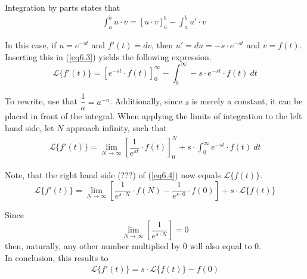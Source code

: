 \begin{tcolorbox}[colback=gray!5!white,colframe=gray!!black,title=Proof 6.1]
Integration by parts states that 
\begin{align}
\int_{a}^{b}{u\cdot v}=\left[u\cdot v\right]_{a}^{b}-\int_{a}^{b}u'\cdot v\
\label{eq6.3}
\end{align}

In this case, if $u=e^{-st}$ and $f'(t)=dv$, then $u'=du=-s\cdot e^{-st}$ and $v=f(t)$.
Inserting this in (\ref{eq6.3}) yields the following expression.
$$\mathcal{L}\{f'(t)\}=\left[e^{-st}\cdot f(t)\right]_{0}^{\infty}-\int_{0}^{\infty} -s\cdot e^{-st}\cdot f(t)\ dt$$

To rewrite, use that $\dfrac{1}{a}=a^{-n}$. Additionally, since $s$ is merely a constant, it can be placed in front of the integral. When applying the limits of integration to the left hand side, let $N$ approach infinity, such that
\begin{align}
\mathcal{L}\{f'(t)\}=\lim_{N \to \infty}\left[\dfrac{1}{e^{st}}\cdot f(t)\right]_{0}^{N}+s\cdot \int_{0}^{\infty}e^{-st}\cdot f(t)\ dt
\label{eq6.4}
\end{align}

Note, that the right hand side (???) of (\ref{eq6.4}) now equals $\mathcal{L}\{f(t)\}$. 
$$\mathcal{L}\{f'(t)\} = \lim_{N \to \infty}\left[\dfrac{1}{e^{s\cdot N}}\cdot f(N)-\dfrac{1}{e^{s\cdot 0}}\cdot f(0)\right]+s\cdot \mathcal{L}\{f(t)\}$$

Since $$\lim_{N \to \infty}\left[\dfrac{1}{e^{s\cdot N}}\right]=0$$ then, naturally, any other number multiplied by 0 will also equal to 0.\\
In conclusion, this results to
\begin{align*}
\mathcal{L}\{f'(t)\} = s\cdot \mathcal{L}\{f(t)\}-f(0)
\end{align*}
\end{tcolorbox}